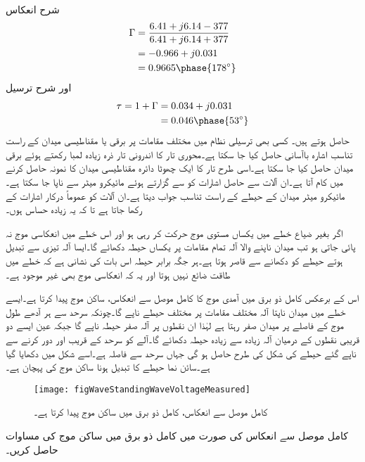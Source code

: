 شرح انعکاس
\begin{align*}
\Gamma&=\frac{6.41+j6.14-377}{6.41+j6.14+377}\\
&=-0.966+j0.031\\
&=0.9665\phase{178^{\circ}}
\end{align*}
اور شرح ترسیل
\begin{align*}
\tau=1+\Gamma&=0.034+j0.031\\
&=0.046\phase{53^{\circ}}
\end{align*}
حاصل ہوتے ہیں۔
کسی بھی ترسیلی نظام میں مختلف مقامات پر برقی یا مقناطیسی میدان کے راست تناسب اشارہ  باآسانی حاصل کیا جا سکتا ہے۔محوری تار کا اندرونی تار ذرہ زیادہ لمبا رکھتے ہوئے برقی میدان حاصل کیا جا سکتا ہے۔اسی  طرح تار کا ایک چھوٹا دائرہ مقناطیسی میدان کا نمونہ حاصل کرنے میں کام آتا ہے۔ان آلات سے حاصل اشارات کو  سے گزارتے ہوئے مائیکرو میٹر سے ناپا جا سکتا ہے۔مائیکرو میٹر میدان کے حیطے کے راست تناسب جواب دیتا ہے۔ان آلات کو عموماً درکار اشارات کے  رکھا جاتا ہے تا کہ یہ زیادہ حساس ہوں۔

اگر بغیر ضیاع خطے میں یکساں مستوی موج حرکت کر رہی ہو اور اس خطے میں انعکاسی موج نہ پائی جاتی ہو تب میدان ناپنے والا آلہ تمام مقامات پر یکساں حیطہ دکھائے گا۔ایسا آلہ تیزی سے تبدیل ہوتے حیطے کو دکھانے سے قاصر ہوتا ہے۔ہر جگہ برابر حیطہ اس بات کی نشانی ہے کہ خطے میں طاقت ضائع نہیں ہوتا اور یہ کہ انعکاسی موج بھی غیر موجود ہے۔

اس کے برعکس کامل ذو برق میں آمدی موج کا کامل موصل سے انعکاس، ساکن موج پیدا کرتا ہے۔ایسے خطے میں میدان ناپتا آلہ مختلف مقامات پر مختلف حیطے ناپے گا۔چونکہ سرحد سے ہر آدھے طول موج کے فاصلے پر میدان صفر رہتا ہے لہٰذا ان نقطوں پر آلہ صفر حیطہ ناپے گا جبکہ عین ایسے دو قریبی نقطوں کے درمیان آلہ زیادہ سے زیادہ حیطہ دکھائے گا۔آلے کو سرحد کے قریب اور دور کرنے سے ناپے گئے حیطے کی شکل  کی طرح حاصل ہو گی جہاں سرحد سے فاصلہ  ہے۔اسے شکل  میں دکھایا گیا ہے۔سائن نما حیطے کا تبدیل ہونا ساکن موج کی پہچان ہے۔

\begin{figure}
\centering
\texttt{[image: figWaveStandingWaveVoltageMeasured]}
\caption{کامل موصل سے انعکاس، کامل ذو برق میں ساکن موج پیدا کرتا ہے۔}
\label{شکل_موج_ساکن_موج_شکل}
\end{figure}

کامل موصل سے انعکاس کی صورت میں کامل ذو برق میں ساکن موج کی مساوات حاصل کریں۔

